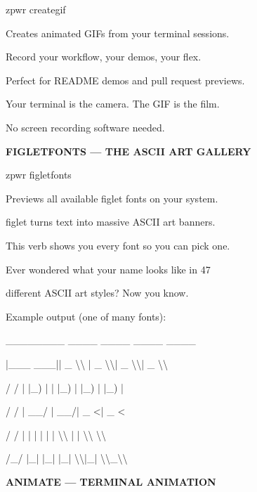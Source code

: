 \documentclass[11pt,a4paper,twoside]{book}
\begin{document}
\begin{codebox}
zpwr creategif\\
\end{codebox}

Creates animated GIFs from your terminal sessions.

Record your workflow, your demos, your flex.

Perfect for README demos and pull request previews.

Your terminal is the camera. The GIF is the film.

No screen recording software needed.


\vspace{12pt}
{\bfseries\color{neonyellow} FIGLETFONTS — THE ASCII ART GALLERY}\vspace{4pt}

\begin{codebox}
zpwr figletfonts\\
\end{codebox}

Previews all available figlet fonts on your system.

figlet turns text into massive ASCII art banners.

This verb shows you every font so you can pick one.

Ever wondered what your name looks like in 47

different ASCII art styles? Now you know.

Example output (one of many fonts):

\_\_\_\_\_\_\_\_  \_\_\_\_      \_\_\_\_  \_\_\_\_  \_\_\_\_

|\_\_\_  \_\_\_||  \_ \textbackslash{}\textbackslash{}    |  \_ \textbackslash{}\textbackslash{}|  \_ \textbackslash{}\textbackslash{}|  \_ \textbackslash{}\textbackslash{}

/ /    | |\_) |   | |\_) | |\_) | |\_) |

/ /     |  \_\_/    |  \_\_/|  \_ <|  \_ <

/ /      | |       | |   | | \textbackslash{}\textbackslash{} | | \textbackslash{}\textbackslash{} \textbackslash{}\textbackslash{}

/\_/       |\_|       |\_|   |\_|  \textbackslash{}\textbackslash{}|\_|  \textbackslash{}\textbackslash{}\_\textbackslash{}\textbackslash{}


\vspace{12pt}
{\bfseries\color{neonyellow} ANIMATE — TERMINAL ANIMATION}\vspace{4pt}
\end{document}
